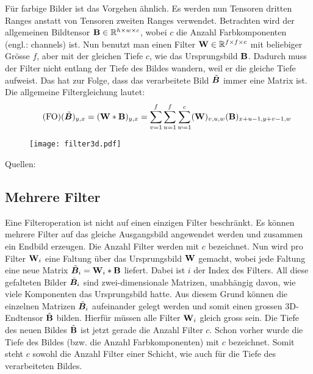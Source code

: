 \para{}
Für farbige Bilder ist das Vorgehen ähnlich. Es werden nun
Tensoren dritten Ranges anstatt von Tensoren zweiten Ranges verwendet.
Betrachten wird der allgemeinen Bildtensor $\mathbf{B} \in \mathbb{R}^{h \times w
  \times c}$, wobei $c$ die Anzahl Farbkomponenten (engl.: channels) ist.
Nun benutzt man einen Filter $\mathbf{W} \in \mathbb{R}^{f \times f \times c}$ mit beliebiger Grösse
$f$, aber mit der gleichen Tiefe $c$, wie das Ursprungsbild $\mathbf{B}$.
Dadurch muss der Filter nicht entlang der Tiefe des Bildes wandern, weil er
die gleiche Tiefe aufweist. Das hat zur Folge, dass das verarbeitete
Bild $\tilde{\bm{B}}$ immer eine Matrix ist.
Die allgemeine Filtergleichung lautet:
\\
\begin{equation}\tag{FO}
  (\tilde{\bm{B}})_{y,x} = (\mathbf{W} * \mathbf{B})_{y,x} = \sum_{v=1}^{f} \sum_{u=1}^{f} \sum_{w=1}^c (\mathbf{W})_{v,u,w} (\mathbf{B})_{x+u-1,y+v-1,w}
\end{equation}
\para{}
\begin{figure}[h!]
  \centering
  \texttt{[image: filter3d.pdf]}
  \label{fig:filter3d}
\end{figure}

\para{}
Quellen: \cite{Goodfellow-et-al-2016} \cite{deeplearning.ai:cnn} \cite{wiki:cnn}

\subsection{Mehrere Filter}
Eine Filteroperation ist nicht auf einen einzigen Filter beschränkt. Es können
mehrere Filter auf das gleiche Ausgangsbild angewendet werden und zusammen ein
Endbild erzeugen.
\para{}
Die Anzahl Filter werden mit $c$ bezeichnet.
Nun wird pro Filter $\mathbf{W}_i$ eine Faltung über das Ursprungsbild $\mathbf{W}$ gemacht, wobei
jede Faltung eine neue Matrix $\tilde{\bm{B}}_i = \mathbf{W}_i * \mathbf{B}$ liefert.
Dabei ist $i$ der Index des Filters. All diese gefalteten Bilder
$\tilde{\bm{B}}_i$ sind zwei-dimensionale Matrizen, unabhängig davon, wie viele
Komponenten das Ursprungsbild hatte. Aus diesem Grund können die einzelnen
Matrizen $\tilde{\bm{B}}_i$ aufeinander gelegt werden und somit einen grossen 3D-Endtensor
$\tilde{\mathbf{B}}$ bilden.
Hierfür müssen alle Filter $\mathbf{W}_i$ gleich gross sein.
Die Tiefe des neuen Bildes $\tilde{\mathbf{B}}$ ist jetzt gerade die Anzahl Filter $c$.
Schon vorher wurde die Tiefe des Bildes (bzw. die Anzahl
Farbkomponenten) mit $c$ bezeichnet. Somit steht $c$ sowohl die Anzahl Filter
einer Schicht, wie auch für die Tiefe des verarbeiteten Bildes.

